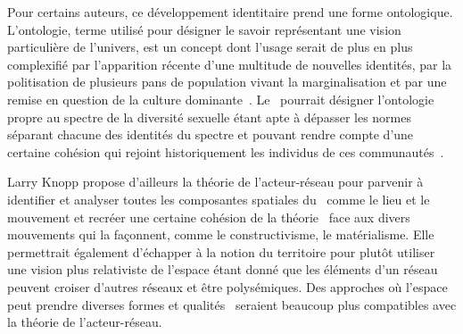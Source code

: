 Pour certains auteurs, ce développement identitaire prend une forme ontologique.
L'ontologie, terme utilisé pour désigner le savoir représentant une vision particulière de l'univers, est un concept dont l'usage serait de plus en plus complexifié par l'apparition récente d'une multitude de nouvelles identités, par la politisation de plusieurs pans de population vivant la marginalisation et par une remise en question de la culture dominante~\citep[122]{Knopp2004}. 
Le \qu\ pourrait désigner l'ontologie propre au spectre de la diversité sexuelle étant apte à dépasser les normes séparant chacune des identités du spectre \lgbt{} et pouvant rendre compte d'une certaine cohésion qui rejoint historiquement les individus de ces communautés~\citep[122]{Knopp2004}.

Larry Knopp propose d'ailleurs la théorie de l'acteur-réseau pour parvenir à identifier et analyser toutes les composantes spatiales du \qu\ comme le lieu et le mouvement et recréer une certaine cohésion de la théorie \qu\ face aux divers mouvements qui la façonnent, comme le constructivisme, le matérialisme. 
Elle permettrait également d'échapper à la notion du territoire pour plutôt utiliser une vision plus relativiste de l'espace étant donné que les éléments d'un réseau peuvent croiser d'autres réseaux et être polysémiques. 
Des approches où l'espace peut prendre diverses formes et qualités~\citep{DiMeo1998} seraient beaucoup plus compatibles avec la théorie de l'acteur-réseau.

